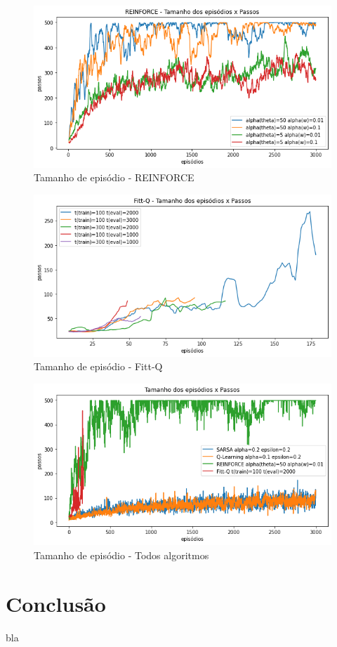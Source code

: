 \documentclass[letterpaper]{article}
\begin{document}
\begin{figure}[t]
  \centering
  \includegraphics[width=0.9\columnwidth]{exp-reinforce-episodes}
  \caption{Tamanho de episódio - REINFORCE}
  \label{fig:exp-reinforce-episodes}
\end{figure}

\begin{figure}[t]
  \centering
  \includegraphics[width=0.9\columnwidth]{exp-fittq-episodes}
  \caption{Tamanho de episódio - Fitt-Q}
  \label{fig:exp-fittq-episodes}
\end{figure}

\begin{figure}[t]
  \centering
  \includegraphics[width=0.9\columnwidth]{exp-allalgs-episodes}
  \caption{Tamanho de episódio - Todos algoritmos}
  \label{fig:exp-allalgs-episodes}
\end{figure}

\section{Conclusão}

bla



\end{document}
